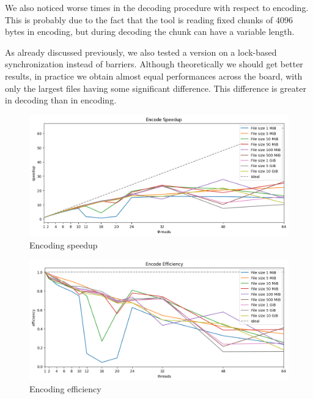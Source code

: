 We also noticed worse times in the decoding procedure with respect to encoding. This is probably due to the fact that the tool is reading fixed chunks of 4096 bytes in encoding, but during decoding the chunk can have a variable length.


As already discussed previously, we also tested a version on a lock-based synchronization instead of barriers. Although theoretically we should get better results, in practice we obtain almost equal performances across the board, with only the largest files having some significant difference. This difference is greater in decoding than in encoding.

\begin{figure}
	\centering
	\includegraphics[width=1\linewidth]{"../imgs/encoding speedup wide"}
	\caption{Encoding speedup}
	\label{fig:encoding-speedup}
\end{figure}
\begin{figure}
	\centering
	\includegraphics[width=1\linewidth]{"../imgs/encode efficiency wide"}
	\caption{Encoding efficiency}
	\label{fig:encoding-efficiency}
\end{figure}

